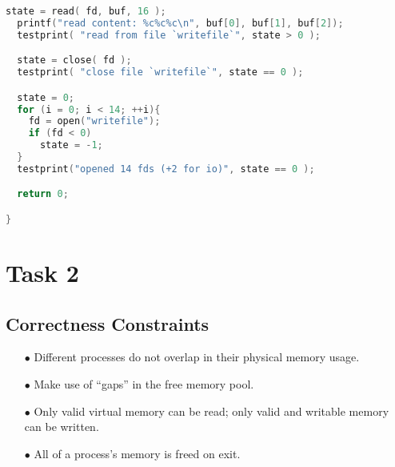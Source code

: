 \documentclass{article}
\begin{document}
\begin{spacing}{1.1}
\begin{lstlisting}[language=C]
  state = read( fd, buf, 16 );
  printf("read content: %c%c%c\n", buf[0], buf[1], buf[2]);
  testprint( "read from file `writefile`", state > 0 );

  state = close( fd );
  testprint( "close file `writefile`", state == 0 );

  state = 0;
  for (i = 0; i < 14; ++i){
    fd = open("writefile");
    if (fd < 0)
      state = -1;
  }
  testprint("opened 14 fds (+2 for io)", state == 0 );

  return 0;

}
\end{lstlisting}

    
\section{Task 2}

\subsection{Correctness Constraints}
\begin{enumerate}
  \item[$\bullet$] Different processes do not overlap in their physical memory usage.
  \item[$\bullet$] Make use of ``gaps'' in the free memory pool.
  \item[$\bullet$] Only valid virtual memory can be read; only valid and writable
    memory can be written.
  \item[$\bullet$] All of a process's memory is freed on exit.
\end{enumerate}


\end{spacing}
\end{document}
